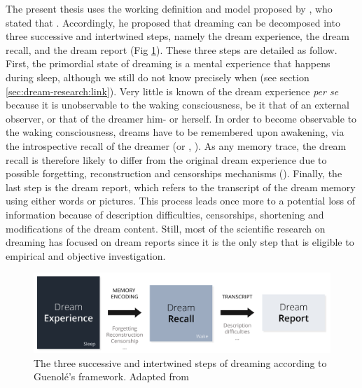 The present thesis uses the working definition and model proposed by \citet{guenole_a_2009}, who stated that . Accordingly, he proposed that dreaming can be decomposed into three successive and intertwined steps, namely the dream experience, the dream recall, and the dream report (Fig \ref{fig:intro:guenole}). These three steps are detailed as follow. First, the primordial state of dreaming is a mental experience that happens during sleep, although we still do not know precisely when (see section \ref{sec:dream-research:link}). Very little is known of the dream experience \emph{per se} because it is unobservable to the waking consciousness, be it that of an external observer, or that of the dreamer him- or herself. In order to become observable to the waking consciousness, dreams have to be remembered upon awakening, via the introspective recall of the dreamer (or , \citealp{schwartz_dreaming:_2005}). As any memory trace, the dream recall is therefore likely to differ from the original dream experience due to possible forgetting, reconstruction and censorships mechanisms (\cite{schwartz_sleep_2002, schwartz_dreaming:_2005}). Finally, the last step is the dream report, which refers to the transcript of the dream memory using either words or pictures. This process leads once more to a potential loss of information because of description difficulties, censorships, shortening and modifications of the dream content. Still, most of the scientific research on dreaming has focused on dream reports since it is the only step that is eligible to empirical and objective investigation.

\begin{figure}[htb]
	\includegraphics[width=\textwidth]{Fig/Intro/Intro_Guenole/Intro_Guenole.png}
	\caption[The three steps of dreaming according to Guenolé's model]{The three successive and intertwined steps of dreaming according to Guenolé's framework. Adapted from \citet{guenole_a_2009}}
	\label{fig:intro:guenole}
\end{figure}

